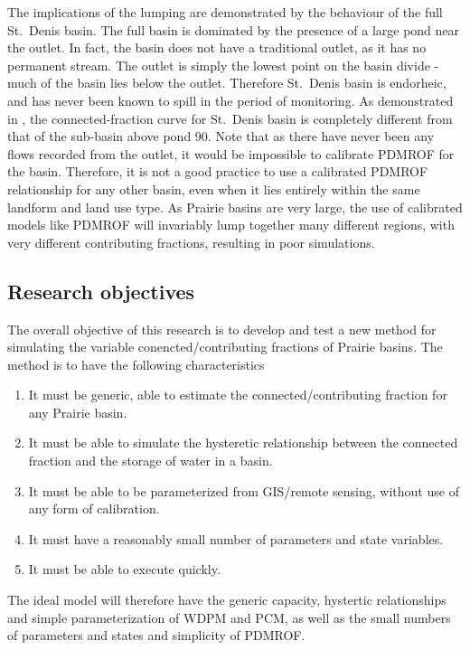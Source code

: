 \documentclass[draft,linenumbers]{agujournal2018}
\begin{document}
The implications of the lumping are demonstrated by the behaviour of the
full St.~Denis basin. The full basin is dominated by the presence of a
large pond near the outlet. In fact, the basin does not have a
traditional outlet, as it has no permanent stream. The outlet is simply
the lowest point on the basin divide - much of the basin lies below the
outlet. Therefore St.~Denis basin is endorheic, and has never been known
to spill in the period of monitoring. As demonstrated in , the
connected-fraction curve for St.~Denis basin is completely different
from that of the sub-basin above pond 90. Note that as there have never
been any flows recorded from the outlet, it would be impossible to
calibrate PDMROF for the basin. Therefore, it is not a good practice to
use a calibrated PDMROF relationship for any other basin, even when it
lies entirely within the same landform and land use type. As Prairie
basins are very large, the use of calibrated models like PDMROF will
invariably lump together many different regions, with very different
contributing fractions, resulting in poor simulations.

\subsection{Research objectives}

The overall objective of this research is to develop and test a new
method for simulating the variable conencted/contributing fractions of
Prairie basins. The method is to have the following characteristics

\begin{enumerate}
\item
  It must be generic, able to estimate the connected/contributing
  fraction for any Prairie basin.
\item
  It must be able to simulate the hysteretic relationship between the
  connected fraction and the storage of water in a basin.
\item
  It must be able to be parameterized from GIS/remote sensing, without
  use of any form of calibration.
\item
  It must have a reasonably small number of parameters and state
  variables.
\item
  It must be able to execute quickly.
\end{enumerate}

The ideal model will therefore have the generic capacity, hystertic
relationships and simple parameterization of WDPM and PCM, as well as
the small numbers of parameters and states and simplicity of PDMROF.
\end{document}

